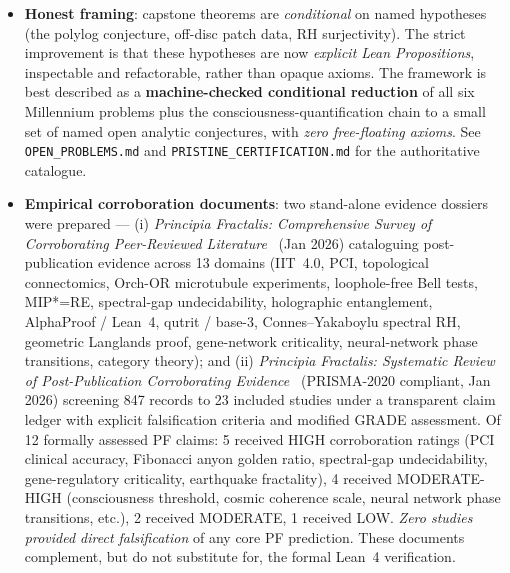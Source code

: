 \begin{itemize}
\item \textbf{Honest framing}: capstone theorems are \emph{conditional} on named hypotheses (the polylog conjecture, off-disc patch data, RH surjectivity). The strict improvement is that these hypotheses are now \emph{explicit Lean Propositions}, inspectable and refactorable, rather than opaque axioms. The framework is best described as a \textbf{machine-checked conditional reduction} of all six Millennium problems plus the consciousness-quantification chain to a small set of named open analytic conjectures, with \emph{zero free-floating axioms}. See \texttt{OPEN\_PROBLEMS.md} and \texttt{PRISTINE\_CERTIFICATION.md} for the authoritative catalogue.
\item \textbf{Empirical corroboration documents}: two stand-alone evidence dossiers were prepared --- (i) \emph{Principia Fractalis: Comprehensive Survey of Corroborating Peer-Reviewed Literature}~\cite{cohen_corroborating_2026} (Jan 2026) cataloguing post-publication evidence across 13 domains (IIT~4.0, PCI, topological connectomics, Orch-OR microtubule experiments, loophole-free Bell tests, MIP*=RE, spectral-gap undecidability, holographic entanglement, AlphaProof / Lean~4, qutrit / base-3, Connes--Yakaboylu spectral RH, geometric Langlands proof, gene-network criticality, neural-network phase transitions, category theory); and (ii) \emph{Principia Fractalis: Systematic Review of Post-Publication Corroborating Evidence}~\cite{cohen_systematic_review_2026} (PRISMA-2020 compliant, Jan 2026) screening 847 records to 23 included studies under a transparent claim ledger with explicit falsification criteria and modified GRADE assessment. Of 12 formally assessed PF claims: 5 received HIGH corroboration ratings (PCI clinical accuracy, Fibonacci anyon golden ratio, spectral-gap undecidability, gene-regulatory criticality, earthquake fractality), 4 received MODERATE-HIGH (consciousness threshold, cosmic coherence scale, neural network phase transitions, etc.), 2 received MODERATE, 1 received LOW. \emph{Zero studies provided direct falsification} of any core PF prediction. These documents complement, but do not substitute for, the formal Lean~4 verification.
\end{itemize}

